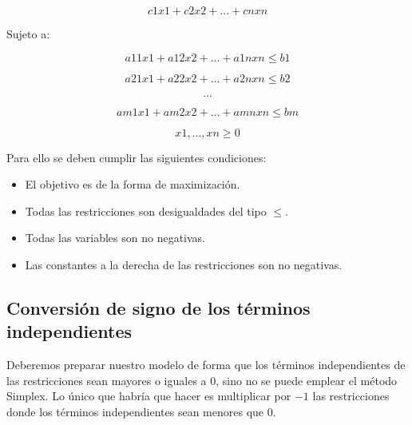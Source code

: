 										$$c1 x1 + c2 x2 + ... + cn xn $$
				
				Sujeto a: 	
				
										$$a11 x1 + a12 x2 + ... + a1n xn \leq b1$$
				
										$$a21 x1 + a22 x2 + ... + a2n xn \leq b2$$
										
										$$...$$
										
										$$am1 x1 + am2 x2 + ... + amn xn \leq bm$$
										
										$$x1,..., xn \geq 0 $$
				
Para ello se deben cumplir las siguientes condiciones:

\begin{itemize}
\item El objetivo es de la forma de maximizaci\'on.
\item Todas las restricciones son desigualdades del tipo $\leq$.
\item Todas las variables son no negativas.
\item Las constantes a la derecha de las restricciones son no negativas.
\end{itemize}

\newpage
\subsection{Conversi\'on de signo de los t\'erminos independientes}

Deberemos preparar nuestro modelo de forma que los t\'erminos independientes de las restricciones sean mayores o iguales a 0, sino no se puede emplear el m\'etodo Simplex. Lo \'unico que habr\'ia que hacer es multiplicar por $-1$ las restricciones donde los t\'erminos independientes sean menores que 0.

